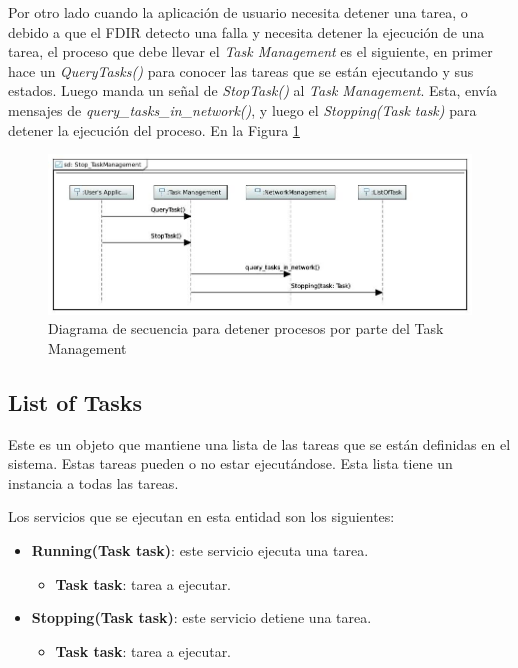 Por otro lado cuando la aplicación de usuario necesita detener una tarea, o debido
a que el FDIR detecto una falla y necesita detener la ejecución de una tarea, el
proceso que debe llevar el \textit{Task Management} es el siguiente, en primer
hace un \textit{QueryTasks()} para conocer las tareas que se están ejecutando y
sus estados. Luego manda un señal de \textit{StopTask()} al \textit{Task
  Management}. Esta, envía mensajes de \textit{query\_tasks\_in\_network()},
y luego el \textit{Stopping(Task task)} para detener la ejecución del proceso.
En la Figura \ref{fig:TaskManagement_StopTask}

\begin{figure}[h!]
 \centering
 \includegraphics[scale=0.4]{images/Secciones/AppendixA/Stop_TaskManagement.JPG}
 \caption{Diagrama de secuencia para detener procesos por parte del
   Task Management}
\label{fig:TaskManagement_StopTask}
\end{figure}

\subsection{List of Tasks}\label{subsection:listoftask}
Este es un objeto que mantiene una lista de las tareas que se están definidas en
el sistema. Estas tareas pueden o no estar ejecutándose. Esta lista tiene un
instancia a todas las tareas. 

Los servicios que se ejecutan en esta entidad son los siguientes:
\begin{itemize}
\item \textbf{Running(Task task)}: este servicio ejecuta una tarea.
  \begin{itemize}
    \item \textbf{Task task}: tarea a ejecutar.
  \end{itemize}  
\item \textbf{Stopping(Task task)}: este servicio detiene una tarea.
  \begin{itemize}
    \item \textbf{Task task}: tarea a ejecutar.
  \end{itemize}
\end{itemize}

